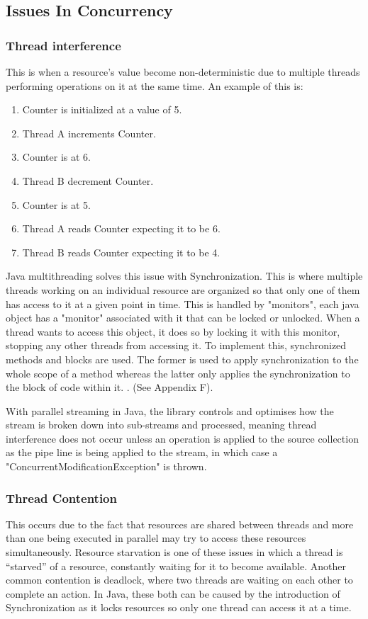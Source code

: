 \documentclass[]{report}
\begin{document}
\subsection{Issues In Concurrency}

\subsubsection{Thread interference}
This is when a resource's value become non-deterministic due to multiple threads performing operations on it at the same time\cite{Thread Interference}. An example of this is:

\begin{enumerate}[topsep=0pt,itemsep=-1ex,partopsep=1ex,parsep=1ex]
	\item Counter is initialized at a value of 5.
	\item Thread A increments Counter.
	\item Counter is at 6.
	\item Thread B decrement Counter.
	\item Counter is at 5.
	\item Thread A reads Counter expecting it to be 6.
	\item Thread B reads Counter expecting it to be 4.	
\end{enumerate}

Java multithreading solves this issue with Synchronization. This is where multiple threads working on an individual resource are organized so that only one of them has access to it at a given point in time. This is handled by "monitors", each java object has a "monitor" associated with it that can be locked or unlocked. When a thread wants to access this object, it does so by locking it with this monitor, stopping any other threads from accessing it. To implement this, synchronized methods and blocks are used. The former is used to apply synchronization to the whole scope of a method whereas the latter only applies the synchronization to the block of code within it. \cite{Synchronization}. (See Appendix F).

With parallel streaming in Java, the library controls and optimises how the stream is broken down into sub-streams and processed, meaning thread interference does not occur unless an operation is applied to the source collection as the pipe line is being applied to the stream, in which case a "ConcurrentModificationException" is thrown.\cite{Streaming Fork Join}

\subsubsection{Thread Contention} 
This occurs due to the fact that resources are shared between threads and more than one  being executed in parallel may try to access these resources simultaneously. Resource starvation is one of these issues in which a thread is “starved” of a resource, constantly waiting for it to become available\cite{Starvation}. Another common contention is deadlock, where two threads are waiting on each other to complete an action. In Java, these both can be caused by the introduction of Synchronization as it locks resources so only one thread can access it at a time.\cite{Synchronization}
\end{document}
